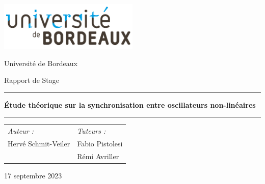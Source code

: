 \begin{titlepage}
    \begin{center}

        \includegraphics[width=0.5\textwidth]{images/title/2560px-Universite_Bordeaux_Logo.svg.png}

        \vspace{1cm}

        \huge{Université de Bordeaux}

        \LARGE{Rapport de Stage}

             
        \vspace{4.5cm}
 
        
 
        
             
        \noindent\rule{0.9\linewidth}{1.5pt}

        \huge{\textbf{Étude théorique sur la synchronisation entre oscillateurs non-linéaires}}
        
        \noindent\rule{0.9\linewidth}{1.5pt}

        \vspace{2cm}

        \renewcommand{\arraystretch}{0.8}
        \begin{tabularx}{0.8\textwidth} { 
            >{\raggedright\arraybackslash}X 
            >{\raggedleft\arraybackslash}X }
           \large{\emph{Auteur :}} & \large{\emph{Tuteurs :}} \\
           \large{Hervé Schmit-Veiler}  & \large{Fabio Pistolesi} \\
           
           & \large{Rémi Avriller}
        \end{tabularx}

        \vfill
      
             
        \normalsize{17 septembre 2023}
             
    \end{center}
 \end{titlepage}